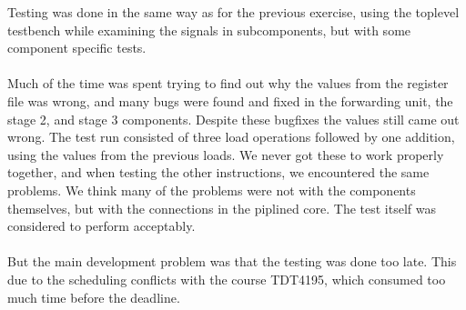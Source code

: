 Testing was done in the same way as for the previous exercise, using the
toplevel testbench while examining the signals in subcomponents, but with some
component specific tests.
\paragraph*{}
Much of the time was spent trying to find out why the values from the register
file was wrong, and many bugs were found and fixed in the forwarding unit, the
stage 2, and stage 3 components. Despite these bugfixes the values still came
out wrong. The test run consisted of three load operations followed by one
addition, using the values from the previous loads. We never got these to work
properly together, and when testing the other instructions, we encountered the
same problems. We think many of the problems were not with the components
themselves, but with the connections in the piplined core. The test itself was
considered to perform acceptably.
\paragraph*{}
But the main development problem was that the testing was done too late. This
due to the scheduling conflicts with the course TDT4195, which consumed too much time before the deadline.
